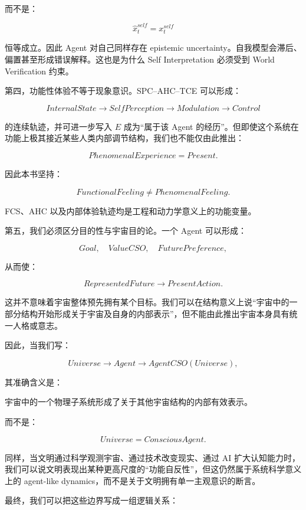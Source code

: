 而不是：

\[
\hat x_t^{self}
=
x_t^{self}
\]

恒等成立。因此 Agent 对自己同样存在 epistemic uncertainty。自我模型会滞后、偏置甚至形成错误解释。这也是为什么 Self Interpretation 必须受到 World Verification 约束。

第四，功能性体验不等于现象意识。SPC--AHC--TCE 可以形成：

\[
InternalState
\rightarrow
SelfPerception
\rightarrow
Modulation
\rightarrow
Control
\]

的连续轨迹，并可进一步写入 \(E\) 成为“属于该 Agent 的经历”。但即使这个系统在功能上极其接近某些人类内部调节结构，我们也不能仅由此推出：

\[
PhenomenalExperience=Present.
\]

因此本书坚持：

\[
\boxed{
FunctionalFeeling
\neq
PhenomenalFeeling.
}
\]

FCS、AHC 以及内部体验轨迹均是工程和动力学意义上的功能变量。

第五，我们必须区分目的性与宇宙目的论。一个 Agent 可以形成：

\[
Goal,
\quad
ValueCSO,
\quad
FuturePreference,
\]

从而使：

\[
RepresentedFuture
\rightarrow
PresentAction.
\]

这并不意味着宇宙整体预先拥有某个目标。我们可以在结构意义上说“宇宙中的一部分结构开始形成关于宇宙及自身的内部表示”，但不能由此推出宇宙本身具有统一人格或意志。

因此，当我们写：

\[
Universe
\rightarrow
Agent
\rightarrow
AgentCSO(Universe),
\]

其准确含义是：

\begin{statementbox}
宇宙中的一个物理子系统形成了关于其他宇宙结构的内部有效表示。
\end{statementbox}

而不是：

\[
Universe
=
ConsciousAgent.
\]

同样，当文明通过科学观测宇宙、通过技术改变现实、通过 AI 扩大认知能力时，我们可以说文明表现出某种更高尺度的“功能自反性”，但这仍然属于系统科学意义上的 agent-like dynamics，而不是关于文明拥有单一主观意识的断言。

最终，我们可以把这些边界写成一组逻辑关系：

\begin{statementbox}
\centering
{}
\end{statementbox}

